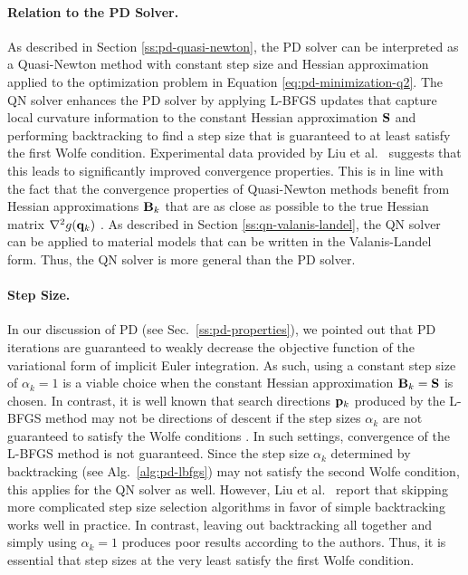 \paragraph{Relation to the PD Solver.}
As described in Section \ref{ss:pd-quasi-newton}, the PD solver can be interpreted as a Quasi-Newton method with constant step size and Hessian approximation 
applied to the optimization problem in Equation \ref{eq:pd-minimization-q2}. The QN solver enhances the PD solver by applying L-BFGS updates that capture local
curvature information to the constant Hessian approximation $\mathbf{S}$ and performing backtracking to find a step size that is guaranteed to at least satisfy 
the first Wolfe condition. Experimental data provided by Liu et al.\ \cite{liu2017} suggests that this leads to 
significantly improved convergence properties. This is in line with the fact that the convergence properties of Quasi-Newton methods benefit from Hessian 
approximations $\mathbf{B}_k$ that are as close as possible to the true Hessian matrix $\nabla^2 g(\mathbf{q}_k)$ \cite{nocedal2006}. As described in Section 
\ref{ss:qn-valanis-landel}, the QN solver can be applied to material models that can be written in the Valanis-Landel form. Thus, the QN solver is 
more general than the PD solver.

\paragraph{Step Size.}
In our discussion of PD (see Sec.\ \ref{ss:pd-properties}), we pointed out that PD iterations are guaranteed to weakly decrease the objective function of 
the variational form of implicit Euler integration. As such, using a constant step size of $\alpha_k = 1$ is a viable choice when the constant Hessian 
approximation $\mathbf{B}_k = \mathbf{S}$ is chosen. In contrast, it is well known that search directions $\mathbf{p}_k$ produced by the L-BFGS method may not 
be directions of descent if the step sizes $\alpha_k$ are not guaranteed to satisfy the Wolfe conditions \cite{nocedal2006}. In such settings, convergence 
of the L-BFGS method 
is not guaranteed. Since the step size $\alpha_k$ determined by backtracking (see Alg.\ \ref{alg:pd-lbfgs}) may not satisfy the second Wolfe 
condition, this applies for the QN solver as well. However, Liu et al.\ \cite{liu2017} report that skipping more complicated step size selection algorithms 
in favor of simple backtracking works well in practice. In contrast, leaving out backtracking all together and simply using $\alpha_k=1$ produces poor 
results according to the authors. Thus, it is essential that step sizes at the very least satisfy the first Wolfe condition.

